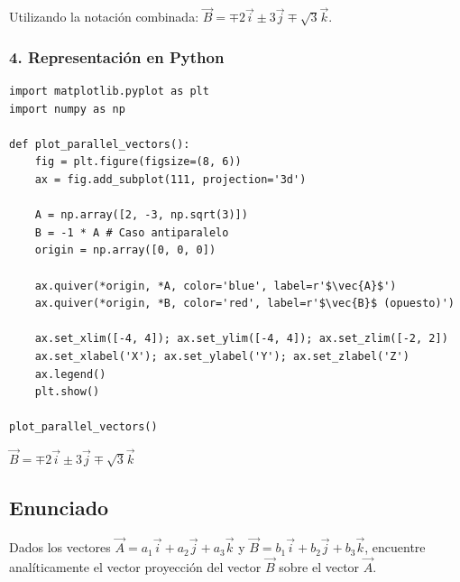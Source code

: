 \documentclass[12pt, a4paper]{article}
\begin{document}
Utilizando la notación combinada: $\vec{B} = \mp 2\vec{i} \pm 3\vec{j} \mp \sqrt{3}\vec{k}$.

\subsubsection*{4. Representación en Python}
\begin{lstlisting}
import matplotlib.pyplot as plt
import numpy as np

def plot_parallel_vectors():
    fig = plt.figure(figsize=(8, 6))
    ax = fig.add_subplot(111, projection='3d')
    
    A = np.array([2, -3, np.sqrt(3)])
    B = -1 * A # Caso antiparalelo
    origin = np.array([0, 0, 0])
    
    ax.quiver(*origin, *A, color='blue', label=r'$\vec{A}$')
    ax.quiver(*origin, *B, color='red', label=r'$\vec{B}$ (opuesto)')
    
    ax.set_xlim([-4, 4]); ax.set_ylim([-4, 4]); ax.set_zlim([-2, 2])
    ax.set_xlabel('X'); ax.set_ylabel('Y'); ax.set_zlabel('Z')
    ax.legend()
    plt.show()

plot_parallel_vectors()
\end{lstlisting}

\begin{tcolorbox}[colback=green!5!white, colframe=green!50!black, title=Respuesta Final]
\centering \Large $\vec{B} = \mp 2\vec{i} \pm 3\vec{j} \mp \sqrt{3} \vec{k}$
\end{tcolorbox}

\newpage

\subsection*{Enunciado}
Dados los vectores $\vec{A} = a_1\vec{i} + a_2\vec{j} + a_3\vec{k}$ y $\vec{B} = b_1\vec{i} + b_2\vec{j} + b_3\vec{k}$, encuentre analíticamente el vector proyección del vector $\vec{B}$ sobre el vector $\vec{A}$.
\end{document}
